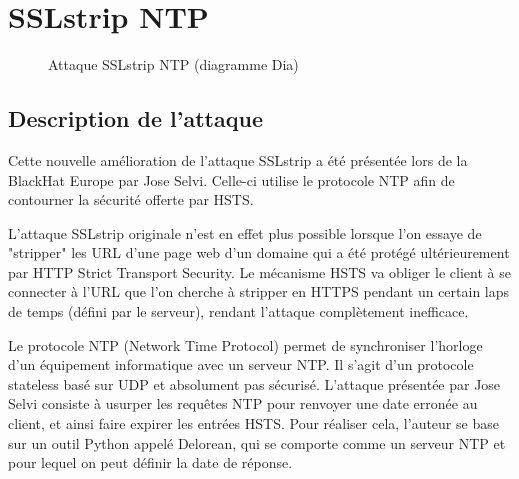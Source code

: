 \chapter{SSLstrip NTP}

\label{sec:sslstrip-ntp}

\begin{figure}[H]
  \caption{Attaque SSLstrip NTP (diagramme Dia)}
\end{figure}

\section{Description de l'attaque}

Cette nouvelle amélioration de l'attaque SSLstrip a été présentée lors de la BlackHat Europe par Jose Selvi. Celle-ci utilise le protocole NTP afin de contourner la sécurité offerte par HSTS.

L'attaque SSLstrip originale n'est en effet plus possible lorsque l'on essaye de "stripper" les URL d'une page web d'un domaine qui a été protégé ultérieurement par HTTP Strict Transport Security. Le mécanisme HSTS va obliger le client à se connecter à l'URL que l'on cherche à stripper en HTTPS pendant un certain laps de temps (défini par le serveur), rendant l'attaque complètement inefficace.

Le protocole NTP (Network Time Protocol) permet de synchroniser l'horloge d'un équipement informatique avec un serveur NTP. Il s'agit d'un protocole stateless basé sur UDP et absolument pas sécurisé. L'attaque présentée par Jose Selvi consiste à usurper les requêtes NTP pour renvoyer une date erronée au client, et ainsi faire expirer les entrées HSTS. Pour réaliser cela, l'auteur se base sur un outil Python appelé Delorean, qui se comporte comme un serveur NTP et pour lequel on peut définir la date de réponse.

